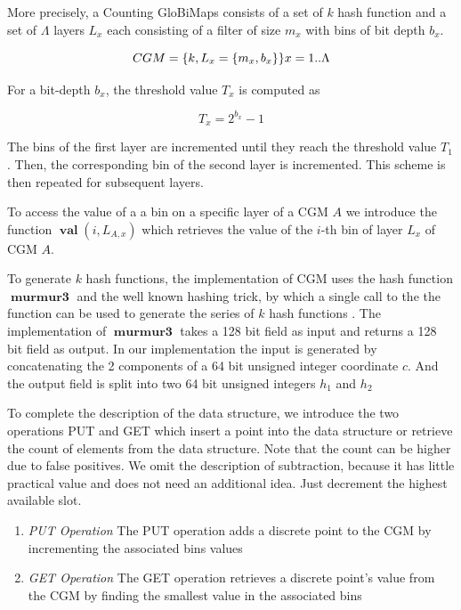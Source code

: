 \documentclass[sigconf]{acmart}
\DeclareMathOperator{\val}{\textbf{val}}
\DeclareMathOperator{\hash}{\textbf{murmur3}}
\begin{document}
More precisely, a  Counting GloBiMaps consists of a set of $k$ hash function
and a set of $\Lambda$ layers $L_x$ each consisting of a filter of
size $m_x$ with bins of bit depth $b_x$.

$$CGM = \{k, L_x = \{m_x, b_x\} \} \space x=1..\Lambda  $$

For a bit-depth $b_x$, the threshold value $T_x$ is computed as

$$ T_x = 2^{b_x}-1$$

The bins of the first layer are incremented until they reach the threshold value
$T_1$. Then, the corresponding bin of the second layer is
incremented. This scheme is then repeated for subsequent layers.

To access the value of a a bin on a specific layer of a CGM $A$ we introduce the function $\val(i, L_{A,x})$ which retrieves the value of the $i$-th bin of layer $L_x$ of CGM $A$.

To generate $k$ hash functions, the implementation of CGM uses the hash function $\hash$ and the well known hashing trick, by which a single call to the the function can be used to generate the series of $k$ hash functions \cite{werner2021globimapsai}.
The implementation of $\hash$ takes a 128 bit field as input and returns a 128 bit field as output. In our implementation the input is generated by concatenating the 2 components of a 64 bit unsigned integer coordinate $c$. And the output field is split into two 64 bit unsigned integers $h_1$ and $h_2$

To complete the description of the data structure, we introduce the two operations PUT and GET which insert a point into the data structure or
retrieve the count of elements from the data structure. Note that the count can be higher due to false positives. We omit the description of subtraction, because it has little practical value and does not need an additional idea. Just decrement the highest available slot.


\begin{enumerate}
  \item{\emph{PUT Operation} The PUT operation adds a discrete point to the CGM by incrementing the associated bins values }
  \item{\emph{GET Operation} The GET operation retrieves a discrete point's value from the CGM  by finding the smallest value in the associated bins}
\end{enumerate}
\end{document}
